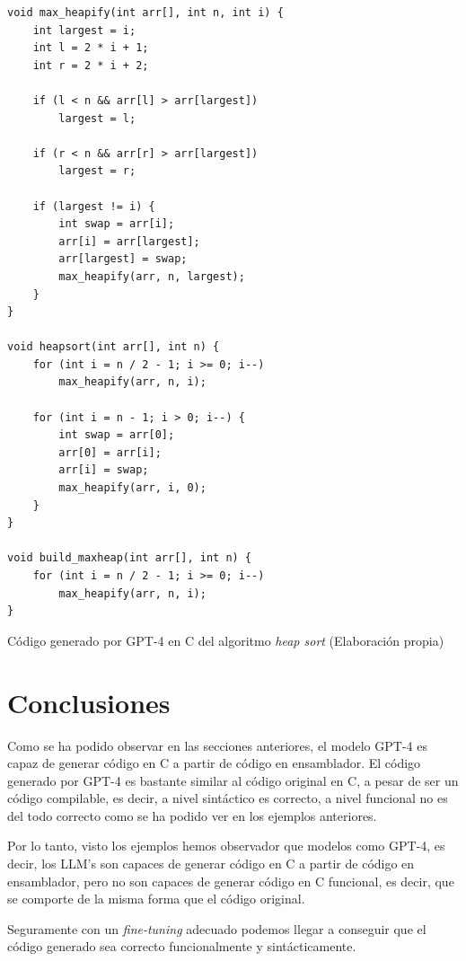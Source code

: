\begin{mycode}
    \begin{verbatim}
void max_heapify(int arr[], int n, int i) {
    int largest = i;
    int l = 2 * i + 1;
    int r = 2 * i + 2;

    if (l < n && arr[l] > arr[largest])
        largest = l;

    if (r < n && arr[r] > arr[largest])
        largest = r;

    if (largest != i) {
        int swap = arr[i];
        arr[i] = arr[largest];
        arr[largest] = swap;
        max_heapify(arr, n, largest);
    }
}

void heapsort(int arr[], int n) {
    for (int i = n / 2 - 1; i >= 0; i--)
        max_heapify(arr, n, i);

    for (int i = n - 1; i > 0; i--) {
        int swap = arr[0];
        arr[0] = arr[i];
        arr[i] = swap;
        max_heapify(arr, i, 0);
    }
}

void build_maxheap(int arr[], int n) {
    for (int i = n / 2 - 1; i >= 0; i--)
        max_heapify(arr, n, i);
}
    \end{verbatim}
    \caption[Código generado por GPT-4 en C del algoritmo \textit{heap sort}]{Código generado por GPT-4 en C del algoritmo \textit{heap sort} (Elaboración propia)}
    \label{cod:resultado_gpt4_prompt}
\end{mycode}

\section{Conclusiones}
\label{sec:conclusiones}


Como se ha podido observar en las secciones anteriores, el modelo GPT-4 es capaz de generar
código en C a partir de código en ensamblador. El código generado por GPT-4 es bastante
similar al código original en C, a pesar de ser un código compilable, es decir, a nivel
sintáctico es correcto, a nivel funcional no es del todo correcto como se ha podido
ver en los ejemplos anteriores.

Por lo tanto, visto los ejemplos hemos observador que modelos como GPT-4, es decir, los LLM's
son capaces de generar código en C a partir de código en ensamblador, pero no son capaces
de generar código en C funcional, es decir, que se comporte de la misma forma que el código
original.

Seguramente con un \textit{fine-tuning} adecuado podemos llegar a conseguir que el código generado
sea correcto funcionalmente y sintácticamente.